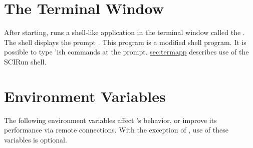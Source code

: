 \section{The Terminal Window}
\label{sec:termwinapp}

After starting, \sr{} runs a shell-like application in the
terminal window called the .  The \sr{} shell displays the
prompt .  This program is  a modified  shell program. It is possible to type
'ish \sr{} commands at the prompt.  \hyperref{A later
  section}{Section~}{}{sec:termapp} describes use of the SCIRun shell.


\section{Environment Variables}
\label{sec:environ} 

\newcommand{\envitem}[1]{\item[\envvar{#1}]\latex{\mbox{}\\}}

The following environment variables affect \sr{}'s behavior, or
improve its performance via remote connections.  With the exception of
, use of these variables is
optional.

